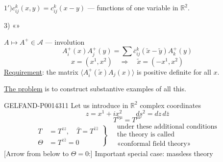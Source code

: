 \(1')\)\quad \(c_{ij}^k(x,y)=c_{ij}^k(x-y)\) — functions of one variable in \(\mathbb R^2\).

3) «»

\(A\mapsto A^+\in\mathcal A\) — involution
\begin{equation*}
\tag{8}
A_i^+(x)A_j^+(y)=\sum\overline c_{ij}^k(\widetilde x-\widetilde y)A_k^+(y)
\end{equation*}
\[
x=(x^1,x^2)\quad\Rightarrow\quad\widetilde x=(-x^1,x^2)
\]
\uline{Requirement}: the matrix \(\langle A_i^+(\widetilde x)A_j(x)\rangle\)
is positive definite for all \(x\).

\uline{The problem} is to construct substantive examples of all this.


\begin{GelfandAdjacentEvidence}{GELFAND-P001431}{1}
Let us introduce in \(\mathbb R^2\) complex coordinates
\[
z=x^1+ix^2\qquad ds^2=dz\,d\bar z
\]
\begin{equation*}
\tag{9}
T^{\nu\mu}=T^{\mu\nu}
\end{equation*}
\begin{equation*}
\tag{10}
\left.\begin{aligned}
T&=T^{zz},\quad \bar T=T^{\bar z\bar z}\\
\Theta&=T^{z\bar z}=0
\end{aligned}\right\}\quad
\begin{gathered}
\text{under these additional conditions}\\
\text{the theory is called}\\
\text{«conformal field theory»}
\end{gathered}
\end{equation*}
[Arrow from below to \(\Theta=0\):] Important special case: massless theory
\end{GelfandAdjacentEvidence}
